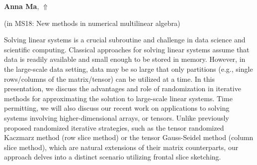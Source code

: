 \documentclass[ILAS2025-program.tex]{subfiles}
\begin{document}
\hypertarget{down0038}{}\begin{ilasabstract}
    
\textbf{Anna Ma},  \hfill \hyperlink{up0038}{$\Uparrow$}
    
    
(in {\color{mstitle}MS18: New methods in numerical multilinear algebra})
        
\mtskip
    Solving linear systems is a crucial subroutine and challenge in data science and scientific computing. Classical approaches for solving linear systems assume that data is readily available and small enough to be stored in memory. However, in the large-scale data setting, data may be so large that only partitions (e.g., single rows/columns of the matrix/tensor) can be utilized at a time. In this presentation, we discuss the advantages and role of randomization in iterative methods for approximating the solution to large-scale linear systems. Time permitting, we will also discuss our recent work on applications to solving systems involving higher-dimensional arrays, or tensors. Unlike previously proposed randomized iterative strategies, such as the tensor randomized Kaczmarz method (row slice method) or the tensor Gauss-Seidel method (column slice method), which are natural extensions of their matrix counterparts, our approach delves into a distinct scenario utilizing frontal slice sketching.

\end{ilasabstract}
    
\end{document}
